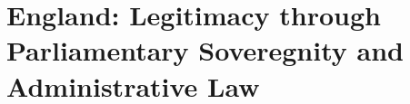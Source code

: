 
\section{England: Legitimacy through Parliamentary Soveregnity and Administrative Law}\label{sec:contrast}


